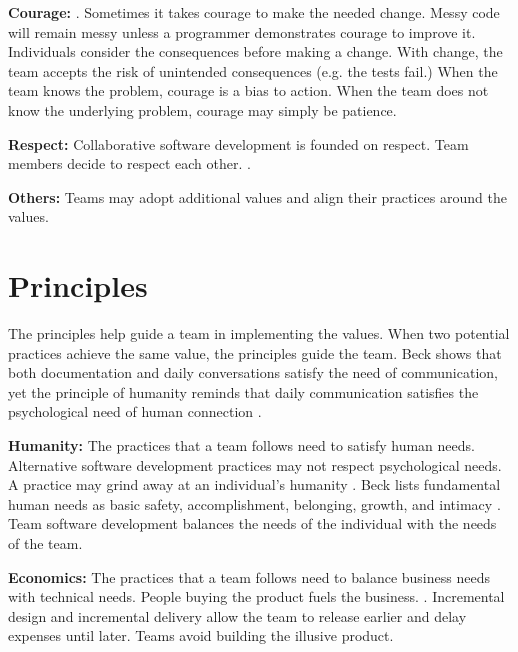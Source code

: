 \textbf{Courage:}    \cite{BeckExtremeProgramming2004}. Sometimes it takes courage to make the needed change. Messy code will remain messy unless a programmer demonstrates courage to improve it. Individuals consider the consequences before making a change. With change, the team accepts the risk of unintended consequences (e.g. the tests fail.) When the team knows the problem, courage is a bias to action. When the team does not know the underlying problem, courage may simply be patience. 

\textbf{Respect:} Collaborative software development is founded on respect. Team members decide to respect each other.  \cite{BeckExtremeProgramming2004}.

\textbf{Others:} Teams may adopt additional values and align their practices around the values. 

\section{Principles}
The principles help guide a team in implementing the values. When two potential practices achieve the same value,  the principles guide the team. Beck shows that both documentation and daily conversations satisfy the need of communication, yet the principle of humanity reminds that daily communication satisfies the psychological need of human connection \cite{BeckExtremeProgramming2004}.

\textbf{Humanity:} The practices that a team follows need to satisfy human needs. Alternative software development practices may not respect psychological needs. A practice may grind away at an individual's humanity \cite{BeckExtremeProgramming2004}. Beck lists fundamental human needs as basic safety, accomplishment, belonging, growth, and intimacy \cite{BeckExtremeProgramming2004}. Team software development balances the needs of the individual with the needs of the team. 

\textbf{Economics:} The practices that a team follows need to balance business needs with technical needs. People buying the product fuels the business.  \cite{BeckExtremeProgramming2004}. Incremental design and incremental delivery allow the team to release earlier and delay expenses until later. Teams avoid building the illusive  product.

